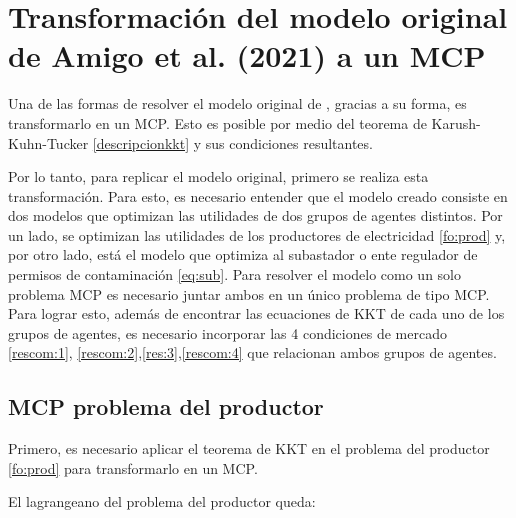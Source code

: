 \section{Transformación del modelo original de Amigo et al. (2021) a un MCP}

Una de las formas de resolver el modelo original de , gracias a su forma, es transformarlo en un MCP. Esto es posible por medio del teorema de Karush-Kuhn-Tucker \ref{descripcionkkt} y sus condiciones resultantes. 
\vspace{2.5mm}

Por lo tanto, para replicar el modelo original, primero se realiza esta transformación. Para esto, es necesario entender que el modelo creado consiste en dos modelos que optimizan las utilidades de dos grupos de agentes distintos. Por un lado, se optimizan las utilidades de los productores de electricidad \ref{fo:prod} y, por otro lado, está el modelo que optimiza al subastador o ente regulador de permisos de contaminación \ref{eq:sub}. Para resolver el modelo como un solo problema MCP es necesario juntar ambos en un único problema de tipo MCP. Para lograr esto, además de encontrar las ecuaciones de KKT de cada uno de los grupos de agentes, es necesario incorporar las 4 condiciones de mercado \ref{rescom:1}, \ref{rescom:2},\ref{res:3},\ref{rescom:4} que relacionan ambos grupos de agentes.

\subsection{MCP problema del productor}

Primero, es necesario aplicar el teorema de KKT en  el problema del productor \ref{fo:prod} para transformarlo en un MCP.
\vspace{2.5mm}

El lagrangeano del problema del productor queda: 

